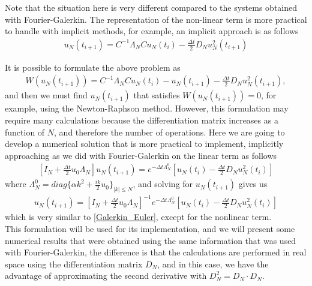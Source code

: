 	Note that the situation here is very different compared to the systems obtained with Fourier-Galerkin. The representation of the non-linear term is more practical to handle with implicit methods, for example, an implicit approach is as follows
	\begin{align*}
		u_N (t_{i + 1} ) =  C^{-1} \Lambda_N C u_N (t_{i}) - \frac{\Delta t}{2} D_N u^2_N (t_{i+1}) 
	\end{align*}
	
	It is possible to formulate the above problem as 
	\begin{align*}
		W(u_N (t_{i + 1})) =  C^{-1} \Lambda_N C u_N (t_{i}) - u_N (t_{i + 1} ) - \frac{\Delta t}{2} D_N u^2_N (t_{i+1}), 
	\end{align*}
	and then we must find $u_N(t_{i + 1})$ that satisfies $W(u_N(t_{i + 1})) = 0$, for example, using the Newton-Raphson method. However, this formulation may require many calculations because the differentiation matrix increases as a function of $N$, and therefore the number of operations. Here we are going to develop a numerical solution that is more practical to implement, implicitly approaching as we did with Fourier-Galerkin on the linear term as follows
	\begin{align*}
		\left[I_N + \frac{\Delta t}{2} u_{0} \Lambda_N \right] u_N (t_{i + 1} ) =  \displaystyle e^{-\Delta t \Lambda^0_N} \left[ u_N (t_{i}) - \frac{\Delta t}{2} D_N u^2_N (t_{i}) \right]
	\end{align*}
	where $\Lambda^0_N = diag \{ \alpha k^2 + \frac{ik}{2} u_0 \}_{|k|\leq N}$, and solving for $u_N (t_{i + 1})$ gives us
	\begin{align}
	\label{Collocation_Euler}	
		u_N (t_{i + 1} ) =  \displaystyle \left[I_N + \frac{\Delta t}{2} u_{0} \Lambda_N \right]^{-1} e^{-\Delta t \Lambda^0_N} \left[ u_N (t_{i})  - \frac{\Delta t}{2} D_N u^2_N (t_{i}) \right]
	\end{align}
	which is very similar to \ref{Galerkin_Euler}, except for the nonlinear term. \\
	  
	This formulation will be used for its implementation, and we will present some numerical results that were obtained using the same information that was used with Fourier-Galerkin, the difference is that the calculations are performed in real space using the differentiation matrix $D_N$, and in this case, we have the advantage of approximating the second derivative with $D^2_N = D_N \cdot D_N$. \\
	
